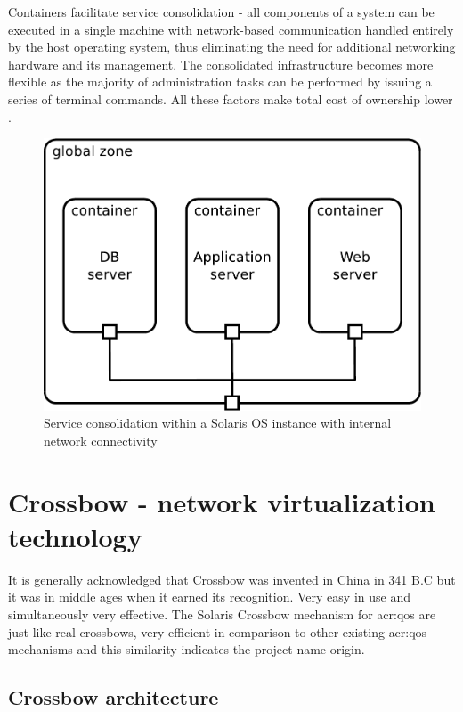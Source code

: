 \documentclass[11pt]{book}
\begin{document}
        Containers facilitate service consolidation - all components of a system can be executed in a single machine
        with network-based communication handled entirely by the host operating system, thus eliminating the need for
        additional networking hardware and its management. The consolidated infrastructure becomes more flexible as the
        majority of administration tasks can be performed by issuing a series of terminal commands. All these factors
        make total cost of ownership lower \cite{price}.

        \begin{figure}[H]
          \begin{center}
            \includegraphics[width=.6\textwidth]{img/solaris/consolidation.pdf}
          \end{center}

          \caption{Service consolidation within a Solaris OS instance with internal network connectivity}
        \end{figure}


    \section{Crossbow - network virtualization technology}
    \label{sec:sol:xbow}


      It is generally acknowledged that Crossbow was invented in China in 341 B.C but it was in middle ages when it
      earned its recognition. Very easy in use and simultaneously very effective. The Solaris Crossbow mechanism for
      \gls{acr:qos} are just like real crossbows, very efficient in comparison to other existing \gls{acr:qos}
      mechanisms and this similarity indicates the project name origin.


      \subsection{Crossbow architecture}
\end{document}
